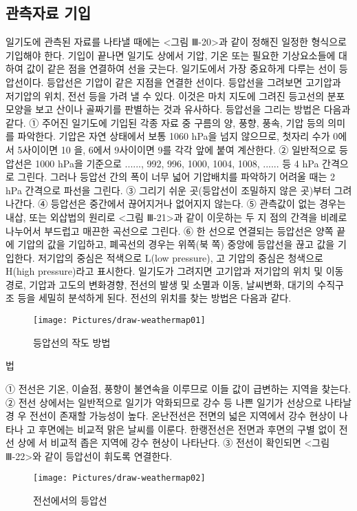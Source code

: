 \subsection{관측자료 기입}
일기도에 관측된 자료를 나타낼 때에는 <그림 Ⅲ-20>과 같이 정해진 일정한 형식으로 기입해야 한다. 기입이 끝나면 일기도 상에서 기압, 기온 또는 필요한 기상요소들에 대하여 값이 같은 점을 연결하여 선을 긋는다. 일기도에서 가장 중요하게 다루는 선이 등압선이다. 등압선은 기압이 같은 지점을 연결한 선이다. 등압선을 그려보면 고기압과 저기압의 위치, 전선 등을 가려 낼 수 있다. 이것은 마치 지도에 그려진 등고선의 분포모양을 보고 산이나 골짜기를 판별하는 것과 유사하다. 등압선을 그리는 방법은 다음과 같다.
① 주어진 일기도에 기입된 각종 자료 중 구름의 양, 풍향, 풍속, 기압 등의 의미를 파악한다.
기압은 자연 상태에서 보통 1060 hPa을 넘지 않으므로, 첫자리 수가 0에서 5사이이면 10
을, 6에서 9사이이면 9를 각각 앞에 붙여 계산한다.
② 일반적으로 등압선은 1000 hPa을 기준으로 ......, 992, 996, 1000, 1004, 1008, ...... 등 4 hPa 간격으로 그린다. 그러나 등압선 간의 폭이 너무 넓어 기압배치를 파악하기 어려울
때는 2 hPa 간격으로 파선을 그린다.
③ 그리기 쉬운 곳(등압선이 조밀하지 않은 곳)부터 그려 나간다.
④ 등압선은 중간에서 끊어지거나 없어지지 않는다.
⑤ 관측값이 없는 경우는 내삽, 또는 외삽법의 원리로 <그림 Ⅲ-21>과 같이 이웃하는 두 지
점의 간격을 비례로 나누어서 부드럽고 매끈한 곡선으로 그린다.
⑥ 한 선으로 연결되는 등압선은 양쪽 끝에 기압의 값을 기입하고, 폐곡선의 경우는 위쪽(북
쪽) 중앙에 등압선을 끊고 값을 기입한다. 저기압의 중심은 적색으로 L(low pressure), 고
기압의 중심은 청색으로 H(high pressure)라고 표시한다.
일기도가 그려지면 고기압과 저기압의 위치 및 이동경로, 기압과 고도의 변화경향, 전선의
발생 및 소멸과 이동, 날씨변화, 대기의 수직구조 등을 세밀히 분석하게 된다. 전선의 위치를
찾는 방법은 다음과 같다.
\begin{figure}
	\centering
	\texttt{[image: Pictures/draw-weathermap01]}
	\caption{등압선의 작도 방법}
	\label{fig:draw-weathermap01}
\end{figure}법

① 전선은 기온, 이슬점, 풍향이 불연속을 이루므로 이들 값이 급변하는 지역을 찾는다.
② 전선 상에서는 일반적으로 일기가 악화되므로 강수 등 나쁜 일기가 선상으로 나타날 경
우 전선이 존재할 가능성이 높다. 온난전선은 전면의 넓은 지역에서 강수 현상이 나타나
고 후면에는 비교적 맑은 날씨를 이룬다. 한랭전선은 전면과 후면의 구별 없이 전선 상에
서 비교적 좁은 지역에 강수 현상이 나타난다.
③ 전선이 확인되면 <그림 Ⅲ-22>와 같이 등압선이 휘도록 연결한다.

\begin{figure}
	\centering
	\texttt{[image: Pictures/draw-weathermap02]}
	\caption{전선에서의 등압선}
	\label{fig:draw-weathermap02}
\end{figure}



